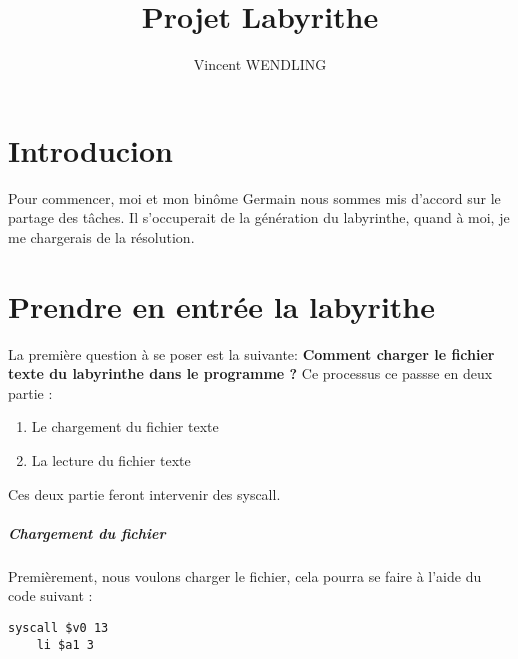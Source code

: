 \documentclass{report}
\author{Vincent WENDLING}
\title{Projet Labyrithe}
\begin{document}
\chapter{Introducion}
Pour commencer, moi et mon binôme Germain nous sommes mis d'accord sur le partage des tâches. Il s'occuperait de la génération du labyrinthe, quand à moi, je me chargerais de la résolution. 


\chapter{Prendre en entrée la labyrithe}
La première question à se poser est la suivante: \textbf{Comment charger le fichier texte du labyrinthe dans le programme ?}
\newline
\newline
Ce processus ce passse en deux partie : 

\begin{enumerate}
	\item Le chargement du fichier texte
	\item La lecture du fichier texte
\end{enumerate}


Ces deux partie feront intervenir des syscall.

\paragraph{Chargement du fichier} 
Premièrement, nous voulons charger le fichier, cela pourra se faire à l'aide du code suivant :
\begin{lstlisting}[language={[mips]Assembler}]
	syscall $v0 13
	li $a1 3
\end{lstlisting}
\end{document}
